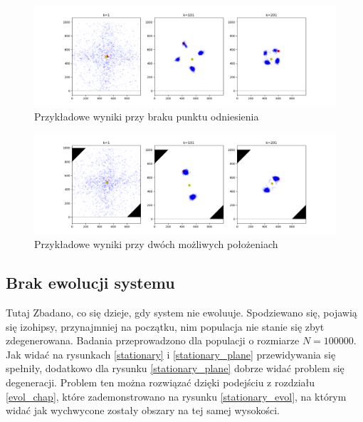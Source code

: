 \begin{figure}[H]
	\begin{center}
		\includegraphics[width=15cm]{./no_pivot.png}
		\caption{Przykładowe wyniki przy braku punktu odniesienia}
		\label{no_pivot}
	\end{center}
\end{figure}

\begin{figure}[H]
	\begin{center}
		\includegraphics[width=15cm]{./one_pivot.png}
		\caption{Przykładowe wyniki przy dwóch możliwych położeniach}
		\label{one_pivot}
	\end{center}
\end{figure}

\subsection{Brak ewolucji systemu}
Tutaj Zbadano, co się dzieje, gdy system nie ewoluuje. Spodziewano się, pojawią się izohipsy, przynajmniej na początku, nim populacja nie stanie się zbyt zdegenerowana. Badania przeprowadzono dla populacji o rozmiarze $N=100000$. Jak widać na rysunkach \ref{stationary} i \ref{stationary_plane} przewidywania się spełniły, dodatkowo dla rysunku \ref{stationary_plane} dobrze widać problem się degeneracji. Problem ten można rozwiązać dzięki podejściu z rozdziału \ref{evol_chap}, które zademonstrowano na rysunku \ref{stationary_evol}, na którym widać jak wychwycone zostały obszary na tej samej wysokości.

